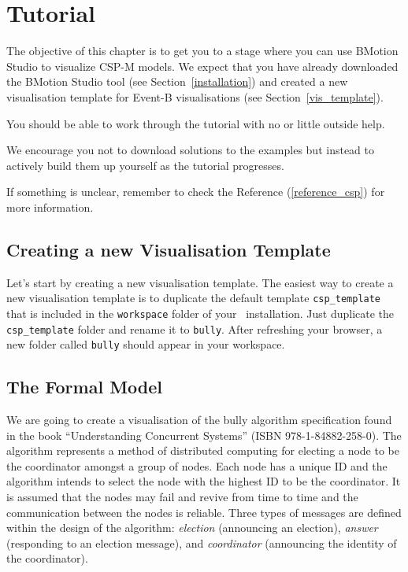 \section{Tutorial}
\label{tutorial_csp}

The objective of this chapter is to get you to a stage where you can use BMotion Studio to visualize CSP-M models. 
We expect that you have already downloaded the BMotion Studio tool (see Section~\ref{installation}) and created a new visualisation template for Event-B visualisations (see Section~\ref{vis_template}).
 
You should be able to work through the tutorial with no or little outside help.

We encourage you not to download solutions to the examples but instead to actively build them up yourself as the tutorial progresses.

If something is unclear, remember to check the Reference (\ref{reference_csp}) for more information.

\subsection{Creating a new Visualisation Template}

Let's start by creating a new visualisation template.
The easiest way to create a new visualisation template is to duplicate the default template \texttt{csp\_template} that is included in the \texttt{workspace} folder of your \bms~installation.
Just duplicate the \texttt{csp\_template} folder and rename it to \texttt{bully}.
After refreshing your browser, a new folder called \texttt{bully} should appear in your workspace.

\subsection{The Formal Model}

We are going to create a visualisation of the bully algorithm specification found in the book ``Understanding Concurrent Systems'' (ISBN 978-1-84882-258-0).
The algorithm represents a method of distributed computing for electing a node to be the coordinator amongst a group of nodes.
Each node has a unique ID and the algorithm intends to select the node with the highest ID to be the coordinator.
It is assumed that the nodes may fail and revive from time to time and the communication between the nodes is reliable.
Three types of messages are defined within the design of the algorithm: \textit{election} (announcing an election), \textit{answer} (responding to an election message), and \textit{coordinator} (announcing the identity of the coordinator).

